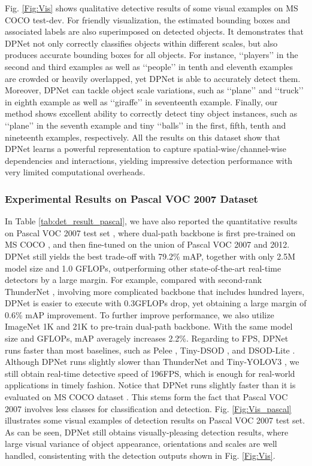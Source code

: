 \documentclass[lettersize,journal]{IEEEtran}
\begin{document}
Fig. \ref{Fig:Vis} shows qualitative detective results of some visual examples on MS COCO test-dev. For friendly visualization, the estimated bounding boxes and associated labels are also superimposed on detected objects. It demonstrates that DPNet not only correctly classifies objects within different scales, but also produces accurate bounding boxes for all objects. For instance, ‘‘players’’ in the second and third examples as well as ‘‘people’’ in tenth and eleventh examples are crowded or heavily overlapped, yet DPNet is able to accurately detect them. Moreover, DPNet can tackle object scale variations, such as ‘‘plane’’ and ‘‘truck’’ in eighth example as well as ‘‘giraffe’’ in seventeenth example. Finally, our method shows excellent ability to correctly detect tiny object instances, such as ‘‘plane’’ in the seventh example and tiny ‘‘balls’’ in the first, fifth, tenth and nineteenth examples, respectively. All the results on this dataset show that DPNet learns a powerful representation to capture spatial-wise/channel-wise dependencies and interactions, yielding impressive detection performance with very limited computational overheads.

\subsubsection{Experimental Results on Pascal VOC 2007 Dataset}
In Table \ref{tab:det_result_pascal}, we have also reported the quantitative results on Pascal VOC 2007 test set \cite{everingham2010pascal}, where dual-path backbone is first pre-trained on MS COCO \cite{lin2014microsoft}, and then fine-tuned on the union of Pascal VOC 2007 and 2012. DPNet still yields the best trade-off with 79.2\% mAP, together with only 2.5M model size and 1.0 GFLOPs, outperforming other state-of-the-art real-time detectors by a large margin. For example, compared with second-rank ThunderNet \cite{qin2019thundernet}, involving more complicated backbone that includes hundred layers, DPNet is easier to execute with 0.3GFLOPs drop, yet obtaining a large margin of 0.6\% mAP improvement. To further improve performance, we also utilize ImageNet 1K and 21K \cite{deng2009imagenet} to pre-train dual-path backbone. With the same model size and GFLOPs, mAP averagely increases 2.2\%. Regarding to FPS, DPNet runs faster than most baselines, such as Pelee \cite{Pelee}, Tiny-DSOD \cite{li2018tiny}, and DSOD-Lite \cite{shen2019object}. Although DPNet runs slightly slower than ThunderNet \cite{qin2019thundernet} and Tiny-YOLOV3 \cite{redmon2018yolov3}, we still obtain real-time detective speed of 196FPS, which is enough for real-world applications in timely fashion. Notice that DPNet runs slightly faster than it is evaluated on MS COCO dataset \cite{lin2014microsoft}. This stems form the fact that Pascal VOC 2007 involves less classes for classification and detection. Fig. \ref{Fig:Vis_pascal} illustrates some visual examples of detection results on Pascal VOC 2007 test set. As can be seen, DPNet still obtains visually-pleasing detection results, where large visual variance of object appearance, orientations and scales are well handled, consistenting with the detection outputs shown in Fig. \ref{Fig:Vis}.
\end{document}
